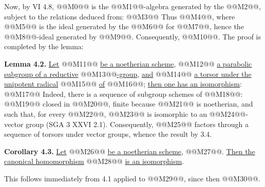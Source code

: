 
Now, by VI 4.8, @@M0@@ is the @@M1@@-algebra generated by the @@M2@@, subject to the relations deduced from:
@@M3@@
Thus @@M4@@, where @@M5@@ is the ideal generated by the @@M6@@ for @@M7@@, hence the @@M8@@-ideal generated by @@M9@@. Consequently, @@M10@@. The proof is completed by the lemma:

\textbf{Lemma 4.2.} \uline{Let} @@M11@@ \uline{be a noetherian scheme}, @@M12@@ \uline{a parabolic subgroup of a reductive} @@M13@@\uline{-group}, \uline{and} @@M14@@ \uline{a torsor under the unipotent radical} @@M15@@ \uline{of} @@M16@@; \uline{then one has an isomorphism}:
@@M17@@
Indeed, there is a sequence of subgroup schemes of @@M18@@:
@@M19@@
closed in @@M20@@, finite because @@M21@@ is noetherian, and such that, for every @@M22@@, @@M23@@ is isomorphic to an @@M24@@-vector group (SGA 3 XXVI 2.1). Consequently, @@M25@@ factors through a sequence of torsors under vector groups, whence the result by 3.4.

\textbf{Corollary 4.3.} \uline{Let} @@M26@@ \uline{be a noetherian scheme}, @@M27@@. \uline{Then the canonical homomorphism} @@M28@@ \uline{is an isomorphism}.

This follows immediately from 4.1 applied to @@M29@@, since then @@M30@@.


